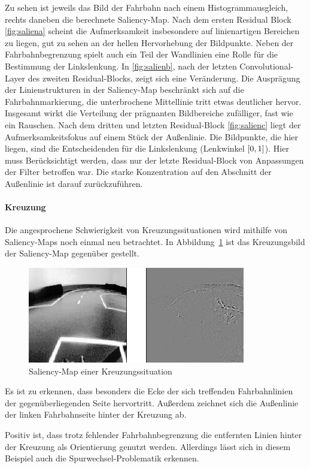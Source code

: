 Zu sehen ist jeweils das Bild der Fahrbahn nach einem Histogrammausgleich, rechts daneben die berechnete Saliency-Map. Nach dem ersten Residual Block \ref{fig:saliena} scheint die Aufmerksamkeit insbesondere auf linienartigen Bereichen zu liegen, gut zu sehen an der hellen Hervorhebung der Bildpunkte. Neben der Fahrbahnbegrenzung spielt auch ein Teil der Wandlinien eine Rolle für die Bestimmung der Linkslenkung. In \ref{fig:salienb}, nach der letzten Convolutional-Layer des zweiten Residual-Blocks, zeigt sich eine Veränderung. Die Ausprägung der Linienstrukturen in der Saliency-Map beschränkt sich auf die Fahrbahnmarkierung, die unterbrochene Mittellinie tritt etwas deutlicher hervor. Insgesamt wirkt die Verteilung der prägnanten Bildbereiche zufälliger, fast wie ein Rauschen.
Nach dem dritten und letzten Residual-Block \ref{fig:salienc} liegt der Aufmerksamkeitsfokus auf einem Stück der Außenlinie.  Die Bildpunkte, die hier liegen, sind die Entscheidenden für die Linkslenkung (Lenkwinkel $\interval{0}{1}$). Hier muss Berücksichtigt werden, dass nur der letzte Residual-Block von Anpassungen der Filter betroffen war. Die starke Konzentration auf den Abschnitt der Außenlinie ist darauf zurückzuführen.

\paragraph{Kreuzung}
Die angesprochene Schwierigkeit von Kreuzungssituationen wird mithilfe von Saliency-Maps noch einmal neu betrachtet. In Abbildung~\ref{img:kreuzung} ist das Kreuzungsbild der Saliency-Map gegenüber gestellt.

\begin{figure}[h]
	\centering
	\includegraphics[scale=1.3]{figures/Kreuzung.png}
	\caption{Saliency-Map einer Kreuzungssituation}
	\label{img:kreuzung}
\end{figure}

Es ist zu erkennen, dass besonders die Ecke der sich treffenden Fahrbahnlinien der gegenüberliegenden Seite hervortritt. Außerdem zeichnet sich die Außenlinie der linken Fahrbahnseite hinter der Kreuzung ab.

Positiv ist, dass trotz fehlender Fahrbahnbegrenzung die entfernten Linien hinter der Kreuzung als Orientierung genutzt werden. Allerdings lässt sich in diesem Beispiel auch die Spurwechsel-Problematik erkennen. 


